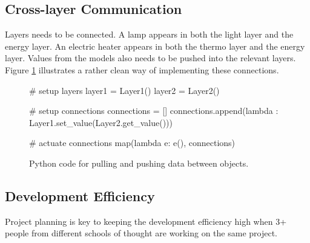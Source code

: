 \documentclass[10pt]{article}
\begin{document}


\subsection{Cross-layer Communication}

Layers needs to be connected. A lamp appears in both the light layer and the energy layer. An electric heater appears in both the thermo layer and the energy layer. Values from the models also needs to be pushed into the relevant layers. Figure \ref{fig:lessons:xlayer} illustrates a rather clean way of implementing these connections.

\begin{figure}[htb]
  \begin{center}
\begin{python}
# setup layers
layer1 = Layer1()
layer2 = Layer2()

# setup connections
connections = []
connections.append(lambda : Layer1.set_value(Layer2.get_value()))

# actuate connections
map(lambda e: e(), connections)
\end{python}
  \end{center}
  \caption{Python code for pulling and pushing data between objects.}
  \label{fig:lessons:xlayer}
\end{figure}

\subsection{Development Efficiency}

Project planning is key to keeping the development efficiency high when 3+ people from different schools of thought are working on the same project.
\end{document}
